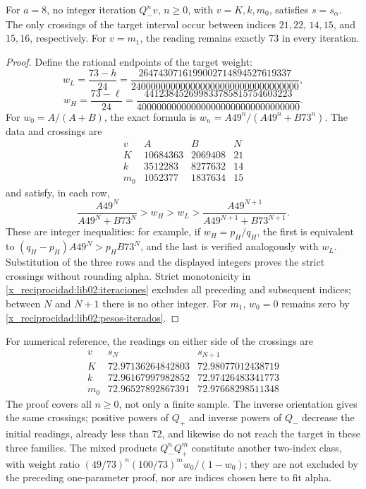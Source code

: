 \begin{proposition}
\label{x_reciprocidad:lib02:cruces-enteros}
For \(a=8\), no integer iteration \(Q_-^nv\), \(n\geq0\), with \(v=K,k,m_0\), satisfies \(s=s_\alpha\). The only crossings of the target interval occur between indices \(21,22\), \(14,15\), and \(15,16\), respectively. For \(v=m_1\), the reading remains exactly 73 in every iteration.
\end{proposition}
\begin{proof}
Define the rational endpoints of the target weight:
\[
 w_L=\frac{73-h}{24}
 =\frac{2647430716199002714894527619337}
 {2400000000000000000000000000000000},
\]
\[
 w_H=\frac{73-\ell}{24}
 =\frac{441238452699833785815754603223}
 {400000000000000000000000000000000}.
\]
For \(w_0=A/(A+B)\), the exact formula is \(w_n=A49^n/(A49^n+B73^n)\). The data and crossings are
\[
\begin{array}{c|r|r|c}
 v&A&B&N\\\hline
 K&10684363&2069408&21\\
 k&3512283&8277632&14\\
 m_0&1052377&1837634&15
\end{array}
\]
and satisfy, in each row,
\[
 \frac{A49^N}{A49^N+B73^N}>w_H>w_L>
 \frac{A49^{N+1}}{A49^{N+1}+B73^{N+1}}.
\]
These are integer inequalities: for example, if \(w_H=p_H/q_H\), the first is equivalent to \((q_H-p_H)A49^N>p_HB73^N\), and the last is verified analogously with \(w_L\). Substitution of the three rows and the displayed integers proves the strict crossings without rounding alpha. Strict monotonicity in \cref{x_reciprocidad:lib02:iteraciones} excludes all preceding and subsequent indices; between \(N\) and \(N+1\) there is no other integer. For \(m_1\), \(w_0=0\) remains zero by \eqref{x_reciprocidad:lib02:pesos-iterados}.
\end{proof}

For numerical reference, the readings on either side of the crossings are
\[
\begin{array}{c|c|c}
 v&s_N&s_{N+1}\\\hline
 K&72.97136264842803&72.98077012438719\\
 k&72.96167997982852&72.97426483341773\\
 m_0&72.96527892867391&72.97668298511348
\end{array}
\]
The proof covers all \(n\geq0\), not only a finite sample.
The inverse orientation gives the same crossings; positive powers of
\(Q_+\) and inverse powers of \(Q_-\) decrease the
initial readings, already less than 72, and likewise do not reach the target
in these three families. The mixed products \(Q_-^nQ_+^m\)
constitute another two-index class, with weight ratio
\((49/73)^n(100/73)^m w_0/(1-w_0)\); they are not excluded by
the preceding one-parameter proof, nor are indices chosen here to fit
alpha.

